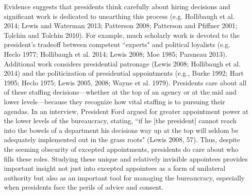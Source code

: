\documentclass[12pt]{article}
\begin{document}
	Evidence suggests that presidents think carefully about hiring decisions and significant work is dedicated to unearthing this process (e.g. Hollibaugh et al. 2014; Lewis and Waterman 2013; Patterson 2008; Patterson and Pfiffner 2001; Tolchin and Tolchin 2010). For example, much scholarly work is devoted to the president's tradeoff between competent ``experts" and political loyalists (e.g. Heclo 1977; Hollibaugh et al. 2014; Lewis 2008; Moe 1985; Parsneau 2013). Additional work considers presidential patronage (Lewis 2008; Hollibaugh et al. 2014) and the politicization of presidential appointments (e.g., Burke 1992; Hart 1995; Heclo 1975; Lewis 2005, 2008; Wayne et al. 1979). Presidents care about all of these staffing decisions---whether at the top of an agency or at the mid and lower levels---because they recognize how vital staffing is to pursuing their agendas. In an interview, President Ford argued for greater appointment power at the lower levels of the bureaucracy, stating, ``if he [the president] cannot reach into the bowels of a department his decisions way up at the top will seldom be adequately implemented out in the grass roots" (Lewis 2008, 57). Thus, despite the seeming obscurity of excepted appointments, presidents do care about who fills these roles. Studying these unique and relatively invisible appointees provides important insight not just into excepted appointees as a form of unilateral authority but also as an important tool for managing the bureaucracy, especially when presidents face the perils of advice and consent. 
	

	
\end{document}

